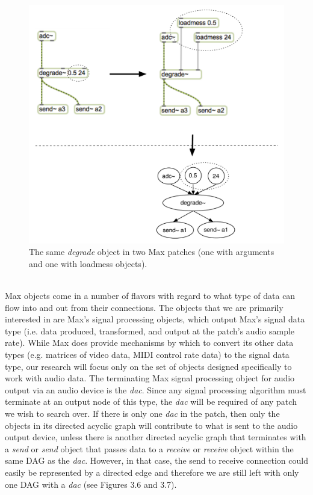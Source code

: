 \documentclass[a4paper,12pt]{report} 	%
\numberwithin{figure}{chapter}
\numberwithin{table}{chapter}
\numberwithin{equation}{chapter}
\begin{document}
\begin{flushleft}
\begin{figure}[h!]
\begin{center}
\includegraphics[scale=0.7]{MaxDAGsLoadmess}
\caption[Using loadmess Objects to Provide Parameters to Max]{The same \emph{degrade\texttildelow{}} object in two Max patches (one with arguments and one with loadmess objects).}
\end{center}
\end{figure}
\\
Max objects come in a number of flavors with regard to what type of data can flow into and out from their connections. The objects that we are primarily interested in are Max's signal processing objects, which output Max's signal data type (i.e. data produced, transformed, and output at the patch's audio sample rate). While Max does provide mechanisms by which to convert its other data types (e.g. matrices of video data, MIDI control rate data) to the signal data type, our research will focus only on the set of objects designed specifically to work with audio data. The terminating Max signal processing object for audio output via an audio device is the \emph{dac\texttildelow{}}. Since any signal processing algorithm must terminate at an output node of this type, the \emph{dac\texttildelow{}} will be required of any patch we wish to search over. If there is only one \emph{dac\texttildelow{}} in the patch, then only the objects in its directed acyclic graph will contribute to what is sent to the audio output device, unless there is another directed acyclic graph that terminates with a \emph{send} or \emph{send\texttildelow{}} object that passes data to a \emph{receive} or \emph{receive\texttildelow{}} object within the same DAG as the \emph{dac\texttildelow{}}. However, in that case, the send to receive connection could easily be represented by a directed edge and therefore we are still left with only one DAG with a \emph{dac\texttildelow{}} (see Figures 3.6 and 3.7).

\end{flushleft}
\end{document}
